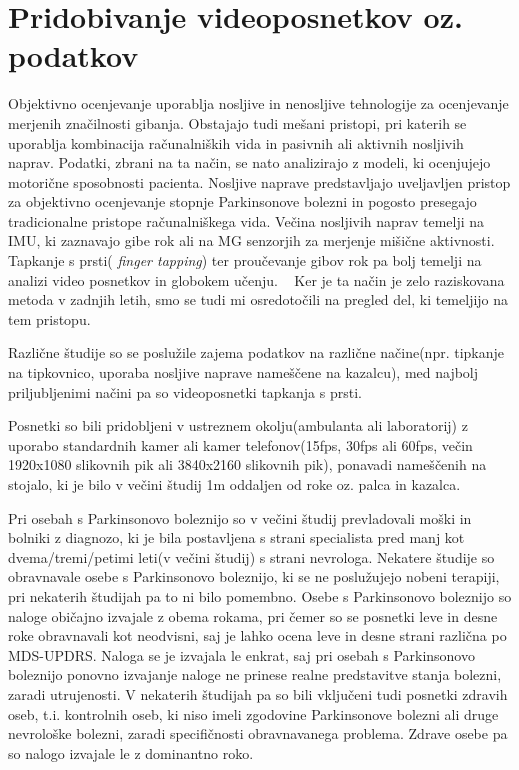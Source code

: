 \documentclass[
]{article}
\begin{document}
\section{Pridobivanje videoposnetkov oz.
podatkov}\label{pridobivanje-videoposnetkov-oz.-podatkov}

Objektivno ocenjevanje uporablja nosljive in nenosljive tehnologije za
ocenjevanje merjenih značilnosti gibanja. Obstajajo tudi mešani
pristopi, pri katerih se uporablja kombinacija računalniških vida in
pasivnih ali aktivnih nosljivih naprav. Podatki, zbrani na ta način, se
nato analizirajo z modeli, ki ocenjujejo motorične sposobnosti pacienta.
Nosljive naprave predstavljajo uveljavljen pristop za objektivno
ocenjevanje stopnje Parkinsonove bolezni in pogosto presegajo
tradicionalne pristope računalniškega vida. Večina nosljivih naprav
temelji na IMU, ki zaznavajo gibe rok ali na MG senzorjih za merjenje
mišične aktivnosti. Tapkanje s prsti( \emph{finger tapping}) ter
proučevanje gibov rok pa bolj temelji na analizi video posnetkov in
globokem učenju. ~ Ker je ta način je zelo raziskovana metoda v zadnjih
letih, smo se tudi mi osredotočili na pregled del, ki temeljijo na tem
pristopu.

Različne študije so se poslužile zajema podatkov na različne načine(npr.
tipkanje na tipkovnico, uporaba nosljive naprave nameščene na kazalcu),
med najbolj priljubljenimi načini pa so videoposnetki tapkanja s prsti.

Posnetki so bili pridobljeni v ustreznem okolju(ambulanta ali
laboratorij) z uporabo standardnih kamer ali kamer telefonov(15fps,
30fps ali 60fps, večin 1920x1080 slikovnih pik ali 3840x2160 slikovnih
pik), ponavadi nameščenih na stojalo, ki je bilo v večini študij 1m
oddaljen od roke oz. palca in kazalca.

Pri osebah s Parkinsonovo boleznijo so v večini študij prevladovali
moški in bolniki z diagnozo, ki je bila postavljena s strani specialista
pred manj kot dvema/tremi/petimi leti(v večini študij) s strani
nevrologa. Nekatere študije so obravnavale osebe s Parkinsonovo
boleznijo, ki se ne poslužujejo nobeni terapiji, pri nekaterih študijah
pa to ni bilo pomembno. Osebe s Parkinsonovo boleznijo so naloge
običajno izvajale z obema rokama, pri čemer so se posnetki leve in desne
roke obravnavali kot neodvisni, saj je lahko ocena leve in desne strani
različna po MDS-UPDRS. Naloga se je izvajala le enkrat, saj pri osebah s
Parkinsonovo boleznijo ponovno izvajanje naloge ne prinese realne
predstavitve stanja bolezni, zaradi utrujenosti. V nekaterih študijah pa
so bili vključeni tudi posnetki zdravih oseb, t.i. kontrolnih oseb, ki
niso imeli zgodovine Parkinsonove bolezni ali druge nevrološke bolezni,
zaradi specifičnosti obravnavanega problema. Zdrave osebe pa so nalogo
izvajale le z dominantno roko.
\end{document}
